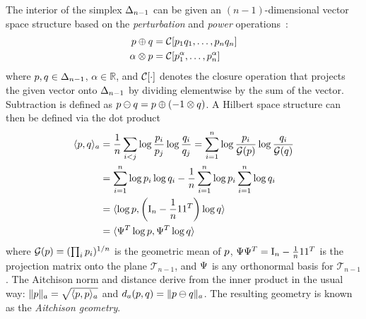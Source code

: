 The interior of the simplex $\Delta_{n-1}$ can be given an $(n-1)$-dimensional vector space structure based on the \textit{perturbation} and \textit{power} operations~\citep{aitchison_statistical_1982,aitchison_principles_1994}:
\begin{align}
    \vv{p} \oplus \vv{q}    & = \Closure{\vv{p}_1 \vv{q}_1, \ldots, \vv{p}_{n} \vv{q}_{n}} \label{eqn:apx:aitchison_plus} \\
    {\alpha} \otimes \vv{p} & = \Closure{\vv{p}_1^\alpha, \ldots, \vv{p}_{n}^\alpha} \label{eqn:apx:aitchison_times}
\end{align}
where $p, q \in \Delta_{n-1}$, $\alpha \in \mathbb{R}$, and $\Closure{\cdot}$ denotes the closure operation that projects the given vector onto $\Delta_{n-1}$ by dividing elementwise by the sum of the vector.
Subtraction is defined as $p \ominus q = p \oplus (-1 \otimes q)$.
A Hilbert space structure can then be defined via the dot product~\citep{egozcue_isometric_2003}
\begin{align}\label{eqn:apx:aitchison_inner_product}
    \langle p, q \rangle_{a} & = \frac{1}{n} \sum_{i < j} \log\frac{p_i}{p_j} \log\frac{q_i}{q_j} = \sum_{i = 1}^{n} \log\frac{p_i}{\mathcal{G}(p)} \log\frac{q_i}{\mathcal{G}(q)} \\
                                       & = \sum_{i = 1}^{n} \log p_i \log q_i - \frac{1}{n} \sum_{i = 1}^{n} \log p_i \sum_{i = 1}^{n} \log q_i                                                                  \\
                                       & = \langle \log p, \left( \mathrm{I}_{n} - \frac{1}{n} \mathrm{1} \mathrm{1}^T \right) \log q \rangle \label{eqn:apx:aitchison_inner_product_projection}                                                        \\
                                       & = \langle \Psi^T \log p, \Psi^T \log q \rangle \label{eqn:apx:aitchison_inner_product_isometry}
\end{align}
where $\mathcal{G}(p) = (\prod_{i} p_i)^{1/n}$ is the geometric mean of $p$, $\Psi \Psi^T = \mathrm{I}_{n} - \frac{1}{n} \mathrm{1} \mathrm{1}^T$ is the projection matrix onto the plane $\mathcal{T}_{n-1}$, and $\Psi$ is any orthonormal basis for $\mathcal{T}_{n-1}$.
The Aitchison norm and distance derive from the inner product in the usual way: $\lVert p \rVert_{a} = \sqrt{\langle p, p \rangle_{a}}$ and $d_{a}(p, q) = \lVert p \ominus q \rVert_{a}$.
The resulting geometry is known as the \textit{Aitchison geometry}.

